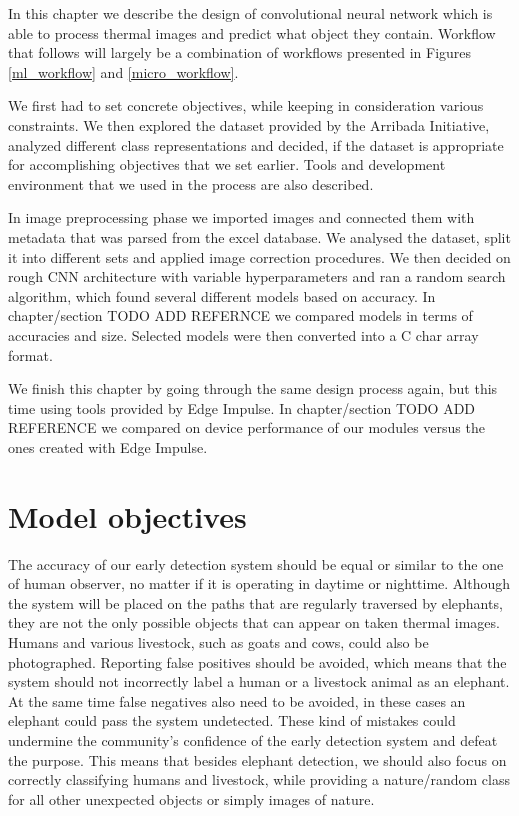 In this chapter we describe the design of convolutional neural network which is able to process thermal images and predict what object they contain.
Workflow that follows will largely be a combination of workflows presented in Figures \ref{ml_workflow} and \ref{micro_workflow}.

We first had to set concrete objectives, while keeping in consideration various constraints.
We then explored the dataset provided by the Arribada Initiative, analyzed different class representations and decided, if the dataset is appropriate for accomplishing objectives that we set earlier.
Tools and development environment that we used in the process are also described.

In image preprocessing phase we imported images and connected them with metadata that was parsed from the excel database.
We analysed the dataset, split it into different sets and applied image correction procedures.
We then decided on rough CNN architecture with variable hyperparameters and ran a random search algorithm, which found several different models based on accuracy.
In chapter/section TODO ADD REFERNCE we compared models in terms of accuracies and size.
Selected models were then converted into a C char array format. 

We finish this chapter by going through the same design process again, but this time using tools provided by Edge Impulse.
In chapter/section TODO ADD REFERENCE we compared on device performance of our modules versus the ones created with Edge Impulse.


\section{ Model objectives}

The accuracy of our early detection system should be equal or similar to the one of human observer, no matter if it is operating in daytime or nighttime.
Although the system will be placed on the paths that are regularly traversed by elephants, they are not the only possible objects that can appear on taken thermal images.
Humans and various livestock, such as goats and cows, could also be photographed.
Reporting false positives should be avoided, which means that the system should not incorrectly label a human or a livestock animal as an elephant.
At the same time false negatives also need to be avoided, in these cases an elephant could pass the system undetected.
These kind of mistakes could undermine the community's confidence of the early detection system and defeat the purpose.
This means that besides elephant detection, we should also focus on correctly classifying humans and livestock, while providing a nature/random class for all other unexpected objects or simply images of nature.

